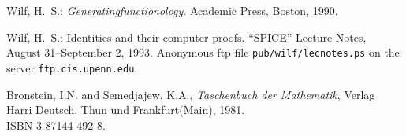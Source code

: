 \begin{thebibliography}{999}
Wilf, H.\ S.:
{\sl Generatingfunctionology}. Academic Press, Boston, 1990.

Wilf, H.\ S.:
Identities and their computer proofs. ``SPICE'' Lecture Notes,
August 31--September 2, 1993.
Anonymous ftp file \texttt{pub/wilf/lecnotes.ps} on
the server \texttt{ftp.cis.upenn.edu}.




 Bronstein, I.N. and Semedjajew, K.A.,
{\it Taschenbuch der Mathematik},
Verlag Harri Deutsch, Thun und Frankfurt(Main),
 1981.\\ISBN 3 87144 492 8.

\end{thebibliography}
